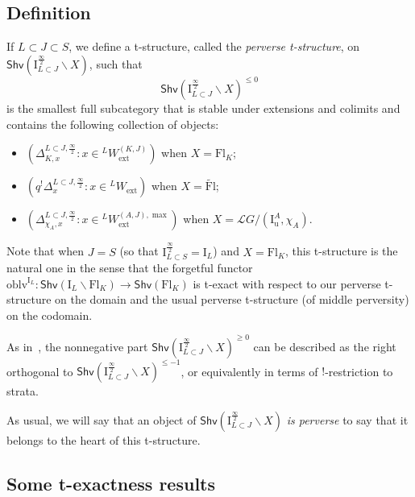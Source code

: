 \documentclass[11pt]{amsart}
\numberwithin{equation}{section}
\theoremstyle{plain}
\theoremstyle{definition}
\newcommand{\I}{{\mathrm I}}
\renewcommand{\k}{\Bbbk}
\newcommand{\sL}{{\mathcal L}}
\newcommand{\semi}{{{\frac{\infty}{2}}}}
\newcommand{\oblv}{\mathrm{oblv}}
\newcommand{\ex}{\mathrm{ext}}
\newcommand{\Shv}{\mathsf{Shv}}
\newcommand{\Fl}{\mathrm{Fl}}
\newcommand{\tFl}{\widetilde{\Fl}}
\newcommand{\Iu}{\mathrm{I}_{\mathrm{u}}}
\begin{document}
\subsection{Definition} 

If $L \subset J \subset S$, we define a t-structure, called the \textit{perverse t-structure}, on $\Shv\left(\I_{L\subset J}^{\semi}\backslash X\right)$, such that 
\[
\Shv\left(\I_{L\subset J}^{\semi}\backslash X\right)^{\leq 0}  
\]
is the smallest full subcategory that is stable under extensions and colimits and contains the following collection of objects: 
\begin{itemize}
\item $\left( \Delta^{L\subset J,\semi}_{K,x} : x\in {}^LW_\ex^{(K,J)} \right)$ when $X=\Fl_K$; 
\item $\left( q^!\Delta^{L\subset J,\semi}_x : x\in {}^LW_\ex \right)$ when $X=\tFl$; 
\item $\left( \Delta^{L\subset J,\semi}_{\chi_A,x} : x\in {}^LW_\ex^{(A,J),\max} \right)$ when $X = \sL G/(\Iu^A,\chi_A)$.
\end{itemize}
Note that when $J=S$ (so that $\I_{L \subset S}^\semi=\I_L$) and $X=\Fl_K$, this t-structure is the natural one in the sense that the forgetful functor $\oblv^{\I_L} : \Shv(\I_L \backslash \Fl_K) \to \Shv(\Fl_K)$ is t-exact with respect to our perverse t-structure on the domain and the usual perverse t-structure (of middle perversity) on the codomain.

As in~\cite[\S 6.1]{adr}, the nonnegative part $\Shv\left(\I_{L\subset J}^{\semi}\backslash X\right)^{\geq 0}$ can be described as the right orthogonal to $\Shv\left(\I_{L\subset J}^{\semi}\backslash X\right)^{\leq -1}$, or equivalently in terms of $!$-restriction to strata.

As usual, we will say that an object of $\Shv\left(\I_{L\subset J}^{\semi}\backslash X\right)$ \emph{is perverse} to say that it belongs to the heart of this t-structure.

\subsection{Some t-exactness results}
\end{document}
